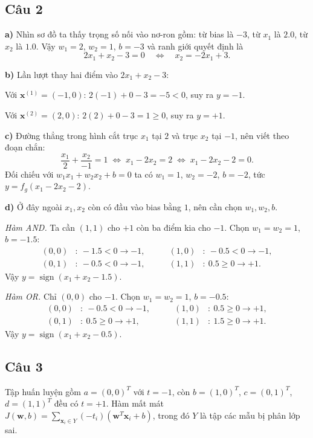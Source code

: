 \documentclass[a4paper,12pt]{article}
\begin{document}
\subsection*{Câu 2}

\textbf{a)} Nhìn sơ đồ ta thấy trọng số nối vào nơ-ron gồm: từ bias là $-3$, từ $x_1$ là
$2.0$, từ $x_2$ là $1.0$. Vậy $w_1 = 2$, $w_2 = 1$, $b = -3$ và ranh giới quyết định là
\[ 2x_1 + x_2 - 3 = 0 \quad\Leftrightarrow\quad x_2 = -2x_1 + 3. \]

\textbf{b)} Lần lượt thay hai điểm vào $2x_1 + x_2 - 3$:

Với $\mathbf{x}^{(1)} = (-1, 0)$: $2(-1) + 0 - 3 = -5 < 0$, suy ra $y = -1$.

Với $\mathbf{x}^{(2)} = (2, 0)$: $2(2) + 0 - 3 = 1 \ge 0$, suy ra $y = +1$.

\textbf{c)} Đường thẳng trong hình cắt trục $x_1$ tại $2$ và trục $x_2$ tại $-1$, nên viết
theo đoạn chắn:
\[ \frac{x_1}{2} + \frac{x_2}{-1} = 1
   \;\Leftrightarrow\; x_1 - 2x_2 = 2
   \;\Leftrightarrow\; x_1 - 2x_2 - 2 = 0. \]
Đối chiếu với $w_1x_1 + w_2x_2 + b = 0$ ta có $w_1 = 1$, $w_2 = -2$, $b = -2$, tức
$y = f_g(x_1 - 2x_2 - 2)$.

\textbf{d)} Ở đây ngoài $x_1, x_2$ còn có đầu vào bias bằng $1$, nên cần chọn $w_1, w_2, b$.

\textit{Hàm AND.} Ta cần $(1,1)$ cho $+1$ còn ba điểm kia cho $-1$. Chọn $w_1 = w_2 = 1$,
$b = -1.5$:
\[
\begin{aligned}
(0,0)&:\ -1.5 < 0 \to -1, &\qquad (1,0)&:\ -0.5 < 0 \to -1,\\
(0,1)&:\ -0.5 < 0 \to -1, &\qquad (1,1)&:\ 0.5 \ge 0 \to +1.
\end{aligned}
\]
Vậy $y = \operatorname{sign}(x_1 + x_2 - 1.5)$.

\textit{Hàm OR.} Chỉ $(0,0)$ cho $-1$. Chọn $w_1 = w_2 = 1$, $b = -0.5$:
\[
\begin{aligned}
(0,0)&:\ -0.5 < 0 \to -1, &\qquad (1,0)&:\ 0.5 \ge 0 \to +1,\\
(0,1)&:\ 0.5 \ge 0 \to +1, &\qquad (1,1)&:\ 1.5 \ge 0 \to +1.
\end{aligned}
\]
Vậy $y = \operatorname{sign}(x_1 + x_2 - 0.5)$.

\subsection*{Câu 3}

Tập huấn luyện gồm $a=(0,0)^T$ với $t=-1$, còn $b=(1,0)^T$, $c=(0,1)^T$, $d=(1,1)^T$
đều có $t=+1$. Hàm mất mát
$J(\mathbf{w},b) = \sum_{\mathbf{x}_i \in Y}(-t_i)(\mathbf{w}^T\mathbf{x}_i + b)$,
trong đó $Y$ là tập các mẫu bị phân lớp sai.
\end{document}
